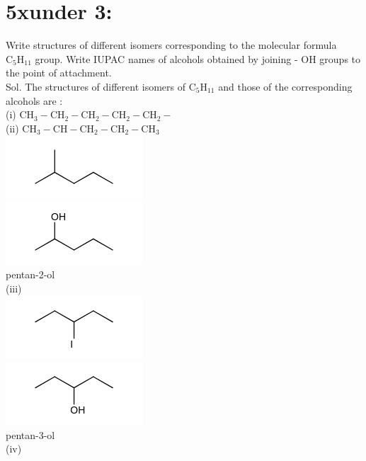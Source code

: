 \documentclass[10pt]{article}
\begin{document}
\section*{5xunder 3:}
Write structures of different isomers corresponding to the molecular formula $\mathrm{C}_{5} \mathrm{H}_{11}$ group. Write IUPAC names of alcohols obtained by joining - OH groups to the point of attachment.\\
Sol. The structures of different isomers of $\mathrm{C}_{5} \mathrm{H}_{11}$ and those of the corresponding alcohols are :\\
(i) $\mathrm{CH}_{3}-\mathrm{CH}_{2}-\mathrm{CH}_{2}-\mathrm{CH}_{2}-\mathrm{CH}_{2}-$\\
(ii) $\mathrm{CH}_{3}-\mathrm{CH}-\mathrm{CH}_{2}-\mathrm{CH}_{2}-\mathrm{CH}_{3}$\\
\includegraphics{smile-104d7a3b8bbc9bca4a916d98513679e3dbe9a0fd}\\
\includegraphics{smile-4491cfeecb592bcf105b84254e48519e242876ea}\\
pentan-2-ol\\
(iii)\\
\includegraphics{smile-7c6bae7270beb57f92121b959b3117608c3c1471}\\
\includegraphics{smile-14e3629f9415d490e488e3508b5c1c299c3957f0}\\
pentan-3-ol\\
(iv)\\
\end{document}
